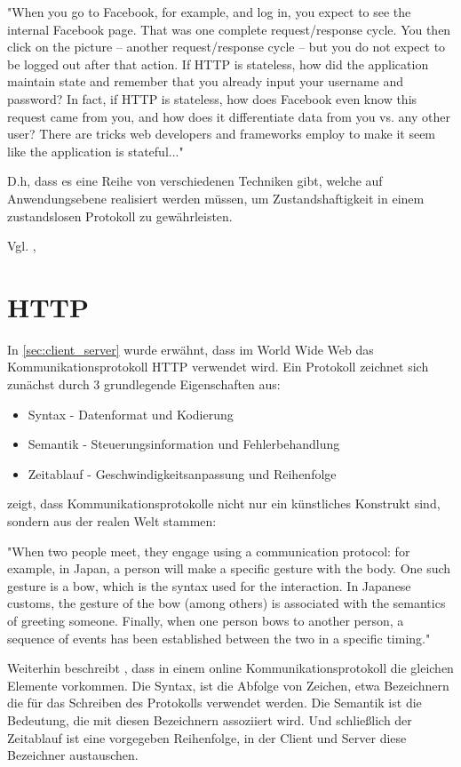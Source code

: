 "When you go to Facebook, for example, and log in, you expect to see the internal Facebook page. That was one complete request/response cycle. You then click on the picture -- another request/response cycle -- but you do not expect to be logged out after that action. If HTTP is stateless, how did the application maintain state and remember that you already input your username and password? In fact, if HTTP is stateless, how does Facebook even know this request came from you, and how does it differentiate data from you vs. any other user? There are tricks web developers and frameworks employ to make it seem like the application is stateful..."

D.h, dass es eine Reihe von verschiedenen Techniken gibt, welche auf Anwendungsebene realisiert werden müssen, um Zustandshaftigkeit in einem zustandslosen Protokoll zu gewährleisten.

Vgl. \citep[Background]{launchschool}, \citep{culloca}

\section{HTTP}

In \ref{sec:client_server} wurde erwähnt, dass im World Wide Web das Kommunikationsprotokoll HTTP verwendet wird. Ein Protokoll zeichnet sich zunächst durch 3 grundlegende Eigenschaften aus:

\begin{itemize} 
\item Syntax - Datenformat und Kodierung
\item Semantik - Steuerungsinformation und Fehlerbehandlung
\item Zeitablauf - Geschwindigkeitsanpassung und Reihenfolge
\end{itemize}

\citep{dubost} zeigt, dass Kommunikationsprotokolle nicht nur ein künstliches Konstrukt sind, sondern aus der realen Welt stammen: 

"When two people meet, they engage using a communication protocol: for example, in Japan, a person will make a specific gesture with the body. One such gesture is a bow, which is the syntax used for the interaction. In Japanese customs, the gesture of the bow (among others) is associated with the semantics of greeting someone. Finally, when one person bows to another person, a sequence of events has been established between the two in a specific timing."

Weiterhin beschreibt \citep{dubost}, dass in einem online Kommunikationsprotokoll die gleichen Elemente vorkommen. Die Syntax, ist die Abfolge von Zeichen, etwa Bezeichnern die für das Schreiben des Protokolls verwendet werden. Die Semantik ist die Bedeutung, die mit diesen Bezeichnern assoziiert wird. Und schließlich der Zeitablauf ist eine vorgegeben Reihenfolge, in der Client und Server diese Bezeichner austauschen.

